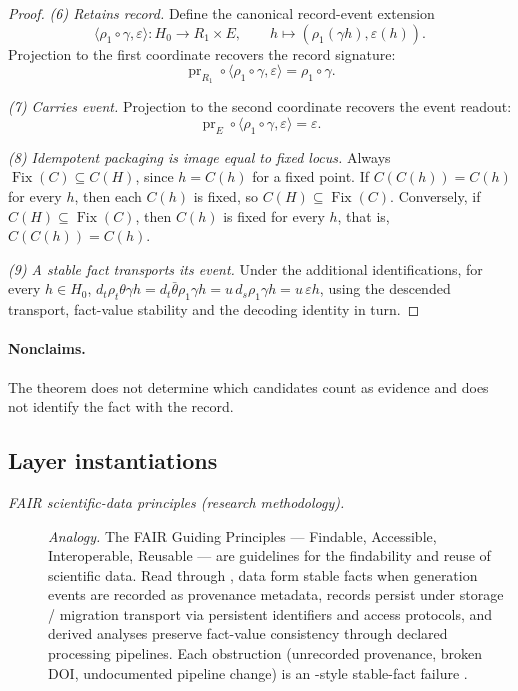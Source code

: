 \begin{proof}
\emph{(6) Retains record.}
Define the canonical record-event extension
\[
  \langle\rho_1\circ\gamma,\varepsilon\rangle:
  H_0\longrightarrow R_1\times E,
  \qquad
  h\longmapsto(\rho_1(\gamma h),\varepsilon(h)).
\]
Projection to the first coordinate recovers the record signature:
\[
  \operatorname{pr}_{R_1}
  \circ\langle\rho_1\circ\gamma,\varepsilon\rangle
  =
  \rho_1\circ\gamma.
\]

\emph{(7) Carries event.}
Projection to the second coordinate recovers the event readout:
\[
  \operatorname{pr}_{E}
  \circ\langle\rho_1\circ\gamma,\varepsilon\rangle
  =
  \varepsilon.
\]

\emph{(8) Idempotent packaging is image equal to fixed locus.}
Always \(\operatorname{Fix}(C)\subseteq C(H)\), since \(h=C(h)\) for a fixed
point. If \(C(C(h))=C(h)\) for every \(h\), then each \(C(h)\) is fixed, so
\(C(H)\subseteq\operatorname{Fix}(C)\). Conversely, if
\(C(H)\subseteq\operatorname{Fix}(C)\), then \(C(h)\) is fixed for every
\(h\), that is, \(C(C(h))=C(h)\).

\emph{(9) A stable fact transports its event.} Under the additional
identifications, for every \(h\in H_0\),
\(d_t\rho_t\theta\gamma h=d_t\bar\theta\rho_1\gamma h=u\,d_s\rho_1\gamma h
=u\,\varepsilon h\), using the descended transport, fact-value stability and
the decoding identity in turn.
\end{proof}

\paragraph{Nonclaims.} The theorem does not determine which candidates count as evidence and
does not identify the fact with the record.

\subsection*{Layer instantiations}\label{layer-inst:F20}

\begingroup\small
\begin{description}
\item[\emph{{FAIR} scientific-data principles (research
methodology).}] \textit{Analogy.}
The FAIR Guiding Principles --- Findable, Accessible,
Interoperable, Reusable --- are guidelines for the findability and
reuse of scientific data.  Read through , data form stable
facts when generation events are recorded as provenance
metadata, records persist under storage / migration transport via
persistent identifiers and access protocols, and derived analyses
preserve fact-value consistency through declared processing
pipelines.  Each obstruction (unrecorded provenance, broken DOI,
undocumented pipeline change) is an -style stable-fact failure
\citep{WilkinsonDumontier2016FAIRPrinciples}.

\end{description}
\endgroup


